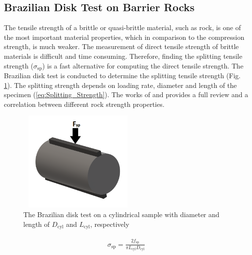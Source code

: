 \subsection{Brazilian Disk Test on Barrier Rocks}
\label{sec:Brazilian_Disk_Exp}

The tensile strength of a brittle or quasi-brittle material, such as rock, is one of the most important material properties, which in comparison to the compression strength, is much weaker. The measurement of direct tensile strength of brittle materials is difficult and time consuming. Therefore, finding the splitting tensile strength ($\sigma_\text{sp}$) is a fast alternative for computing the direct tensile strength. The Brazilian disk test is conducted to determine the splitting tensile strength (Fig. \ref{fig:Amir_Splitting_Theory}). The splitting strength depends on loading rate, diameter and length of the specimen (\ref{eq:Splitting_Strength}). The works of \cite{Perras2014} and \cite{Li2013} provides a full review and a correlation between different rock strength properties.

\begin{figure}[!ht]
\centering
\includegraphics[width=6cm,height=5cm]{figures/Amir_Splitting_Theory.png}
\caption{The Brazilian disk test on a cylindrical sample with diameter and length of $D_\text{cyl}$ and $L_\text{cyl}$, respectively}
\label{fig:Amir_Splitting_Theory}
\end{figure} 

\begin{align}
\label{eq:Splitting_Strength}
\begin{split}
\sigma_\text{sp}=\frac{2f_\text{sp}}{\pi L_\text{cyl}D_\text{cyl}}
\end{split}
\end{align}

